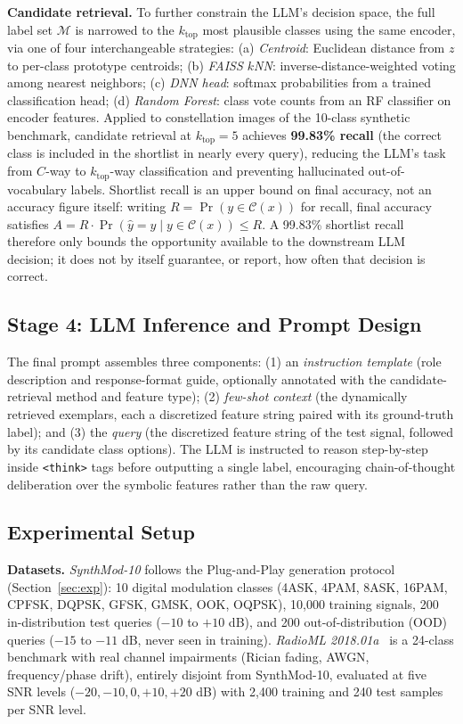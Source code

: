 \textbf{Candidate retrieval.} To further constrain the LLM's decision space, the full label set $\mathcal{M}$ is narrowed to the $k_{\mathrm{top}}$ most plausible classes using the same encoder, via one of four interchangeable strategies: (a) \emph{Centroid}: Euclidean distance from $z$ to per-class prototype centroids; (b) \emph{FAISS $k$NN}: inverse-distance-weighted voting among nearest neighbors; (c) \emph{DNN head}: softmax probabilities from a trained classification head; (d) \emph{Random Forest}: class vote counts from an RF classifier on encoder features. Applied to constellation images of the 10-class synthetic benchmark, candidate retrieval at $k_{\mathrm{top}}=5$ achieves \textbf{99.83\% recall} (the correct class is included in the shortlist in nearly every query), reducing the LLM's task from $C$-way to $k_{\mathrm{top}}$-way classification and preventing hallucinated out-of-vocabulary labels. Shortlist recall is an upper bound on final accuracy, not an accuracy figure itself: writing $R=\Pr(y\in\mathcal{C}(x))$ for recall, final accuracy satisfies $A = R\cdot\Pr(\hat y = y \mid y \in \mathcal{C}(x)) \leq R$. A 99.83\% shortlist recall therefore only bounds the opportunity available to the downstream LLM decision; it does not by itself guarantee, or report, how often that decision is correct.

\subsection{Stage 4: LLM Inference and Prompt Design}

The final prompt assembles three components: (1) an \emph{instruction template} (role description and response-format guide, optionally annotated with the candidate-retrieval method and feature type); (2) \emph{few-shot context} (the dynamically retrieved exemplars, each a discretized feature string paired with its ground-truth label); and (3) the \emph{query} (the discretized feature string of the test signal, followed by its candidate class options). The LLM is instructed to reason step-by-step inside \texttt{<think>} tags before outputting a single label, encouraging chain-of-thought deliberation over the symbolic features rather than the raw query.

\subsection{Experimental Setup}
\label{sec:disc_exp_setup}

\textbf{Datasets.} \emph{SynthMod-10} follows the Plug-and-Play generation protocol (Section~\ref{sec:exp}): 10 digital modulation classes (4ASK, 4PAM, 8ASK, 16PAM, CPFSK, DQPSK, GFSK, GMSK, OOK, OQPSK), 10,000 training signals, 200 in-distribution test queries ($-10$ to $+10$ dB), and 200 out-of-distribution (OOD) queries ($-15$ to $-11$ dB, never seen in training). \emph{RadioML 2018.01a}~\cite{oshea2018radioml} is a 24-class benchmark with real channel impairments (Rician fading, AWGN, frequency/phase drift), entirely disjoint from SynthMod-10, evaluated at five SNR levels ($-20,-10,0,+10,+20$ dB) with 2{,}400 training and 240 test samples per SNR level.

